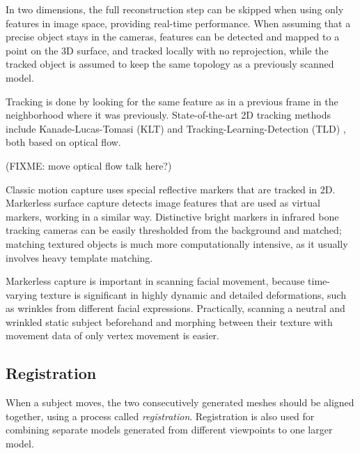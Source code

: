 

In two dimensions, the full reconstruction step can be skipped when using only features in image space, providing real-time performance. \cite{pilet2005real}
When assuming that a precise object stays in the cameras, features can be detected and mapped to a point on the 3D surface, and tracked locally with no reprojection, while the tracked object is assumed to keep the same topology as a previously scanned model.

Tracking is done by looking for the same feature as in a previous frame in the neighborhood where it was previously.
State-of-the-art 2D tracking methods include Kanade-Lucas-Tomasi (KLT) \cite{KLT} and Tracking-Learning-Detection (TLD) \cite{TLD}, both based on optical flow.

(FIXME: move optical flow talk here?)


Classic motion capture uses special reflective markers that are tracked in 2D.
Markerless surface capture detects image features that are used as virtual markers, working in a similar way.
Distinctive bright markers in infrared bone tracking cameras can be easily thresholded from the background and matched; matching textured objects is much more computationally intensive, as it usually involves heavy template matching.


Markerless capture is important in scanning facial movement, because time-varying texture is significant in highly dynamic and detailed deformations, such as wrinkles from different facial expressions.
Practically, scanning a neutral and wrinkled static subject beforehand and morphing between their texture with movement data of only vertex movement is easier.


\subsection{Registration} %

When a subject moves, the two consecutively generated meshes should be aligned together, using a process called \emph{registration}.
Registration is also used for combining separate models generated from different viewpoints to one larger model.

